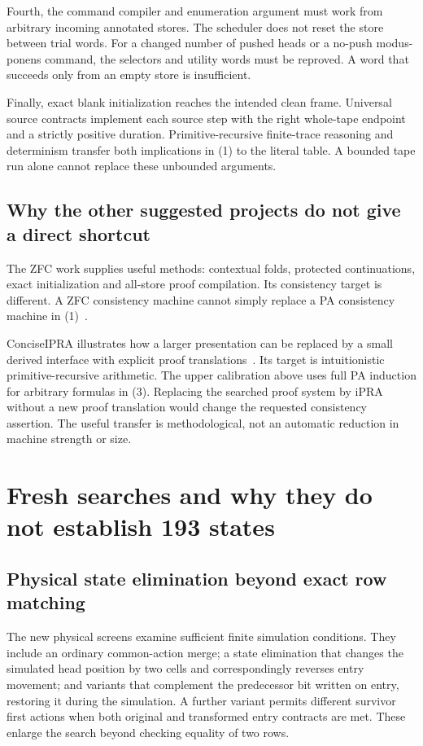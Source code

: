 \documentclass[11pt,letterpaper]{article}
\begin{document}
Fourth, the command compiler and enumeration argument must work from
arbitrary incoming annotated stores. The scheduler does not reset the
store between trial words. For a changed number of pushed heads or a
no-push modus-ponens command, the selectors and utility words must be
reproved. A word that succeeds only from an empty store is insufficient.

Finally, exact blank initialization reaches the intended clean frame.
Universal source contracts implement each source step with the right
whole-tape endpoint and a strictly positive duration. Primitive-recursive
finite-trace reasoning and determinism transfer both implications in (1)
to the literal table. A bounded tape run alone cannot replace these
unbounded arguments.

\subsection{Why the other suggested projects do not give a direct shortcut}

The ZFC work supplies useful methods: contextual folds, protected
continuations, exact initialization and all-store proof compilation.
Its consistency target is different. A ZFC consistency machine cannot
simply replace a PA consistency machine in (1)~\cite{zfc}.

ConciseIPRA illustrates how a larger presentation can be replaced by a
small derived interface with explicit proof translations~\cite{ipra}.
Its target is intuitionistic primitive-recursive arithmetic. The upper
calibration above uses full PA induction for arbitrary formulas in (3).
Replacing the searched proof system by iPRA without a new proof translation
would change the requested consistency assertion. The useful transfer is
methodological, not an automatic reduction in machine strength or size.




\section{Fresh searches and why they do not establish 193 states}
\label{sec:search}

\subsection{Physical state elimination beyond exact row matching}

The new physical screens examine sufficient finite simulation conditions.
They include an ordinary common-action merge; a state elimination that
changes the simulated head position by two cells and correspondingly
reverses entry movement; and variants that complement the predecessor
bit written on entry, restoring it during the simulation. A further
variant permits different survivor first actions when both original and
transformed entry contracts are met. These enlarge the search beyond
checking equality of two rows.
\end{document}
